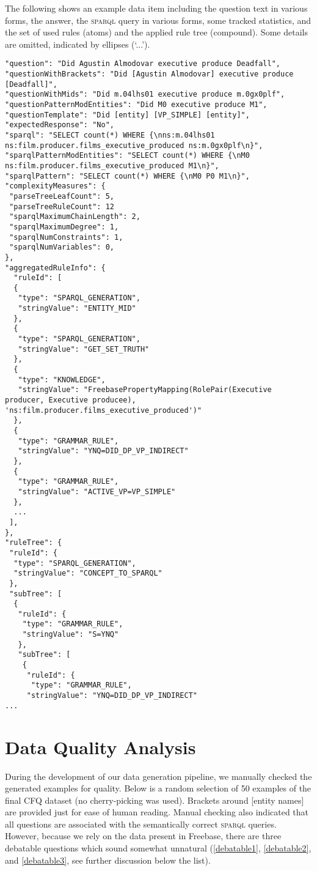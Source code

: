 \documentclass[letterpaper]{article}
\newcommand{\SPARQL}{\textsc{sparql}}
\begin{document}
The following shows an example data item including the question text in various forms, the answer, the \SPARQL{} query in various forms, some tracked statistics, and the set of used rules (atoms) and the applied rule tree (compound). Some details are omitted, indicated by ellipses (`...').
\begin{lstlisting}[frame=single]
"question": "Did Agustin Almodovar executive produce Deadfall",
"questionWithBrackets": "Did [Agustin Almodovar] executive produce [Deadfall]",
"questionWithMids": "Did m.04lhs01 executive produce m.0gx0plf",
"questionPatternModEntities": "Did M0 executive produce M1",
"questionTemplate": "Did [entity] [VP_SIMPLE] [entity]",
"expectedResponse": "No",
"sparql": "SELECT count(*) WHERE {\nns:m.04lhs01 ns:film.producer.films_executive_produced ns:m.0gx0plf\n}",
"sparqlPatternModEntities": "SELECT count(*) WHERE {\nM0 ns:film.producer.films_executive_produced M1\n}",
"sparqlPattern": "SELECT count(*) WHERE {\nM0 P0 M1\n}",
"complexityMeasures": {
 "parseTreeLeafCount": 5,
 "parseTreeRuleCount": 12
 "sparqlMaximumChainLength": 2,
 "sparqlMaximumDegree": 1,
 "sparqlNumConstraints": 1,
 "sparqlNumVariables": 0,
},
"aggregatedRuleInfo": {
  "ruleId": [
  {
   "type": "SPARQL_GENERATION",
   "stringValue": "ENTITY_MID"
  },
  {
   "type": "SPARQL_GENERATION",
   "stringValue": "GET_SET_TRUTH"
  },
  {
   "type": "KNOWLEDGE",
   "stringValue": "FreebasePropertyMapping(RolePair(Executive producer, Executive producee), 'ns:film.producer.films_executive_produced')"
  },
  {
   "type": "GRAMMAR_RULE",
   "stringValue": "YNQ=DID_DP_VP_INDIRECT"
  },
  {
   "type": "GRAMMAR_RULE",
   "stringValue": "ACTIVE_VP=VP_SIMPLE"
  },
  ...
 ],
},
"ruleTree": {
 "ruleId": {
  "type": "SPARQL_GENERATION",
  "stringValue": "CONCEPT_TO_SPARQL"
 },
 "subTree": [
  {
   "ruleId": {
    "type": "GRAMMAR_RULE",
    "stringValue": "S=YNQ"
   },
   "subTree": [
    {
     "ruleId": {
      "type": "GRAMMAR_RULE",
     "stringValue": "YNQ=DID_DP_VP_INDIRECT"
...
\end{lstlisting}

\section{Data Quality Analysis}
\label{suppl:data-quality-analysis}

During the development of our data generation pipeline, we manually checked the generated examples for quality.
Below is a random selection of 50 examples of the final CFQ dataset (no cherry-picking was used). Brackets around [entity names] are provided just for ease of human reading.
Manual checking also indicated that all questions are associated with the semantically correct \SPARQL{} queries.
However, because we rely on the data present in Freebase, there are three debatable questions which sound somewhat unnatural (\ref{debatable1}, \ref{debatable2}, and \ref{debatable3}, see further discussion below the list).
\end{document}
